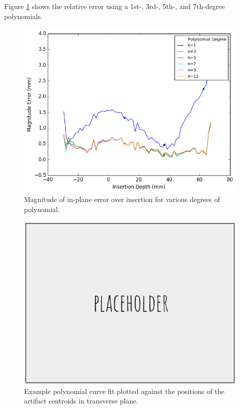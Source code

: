 Figure \ref{fig:results_error_comparison} shows the relative error using a 1st-, 3rd-, 5th-, and 7th-degree polynomials. 

\begin{figure}[h]
\includegraphics[width=1.0\textwidth]{Fig/chap5/errors_polynomials.png}
\caption{Magnitude of in-plane error over insertion for various degrees of polynomial.}
\label{fig:results_error_comparison}
\end{figure}

\begin{figure}[h]
\includegraphics[width=1.0\textwidth]{Fig/placeholder.png}
\caption{Example polynomial curve fit plotted against the positions of the artifact centroids in transverse plane.}
\label{fig:curve_fit_artifact}
\end{figure}

